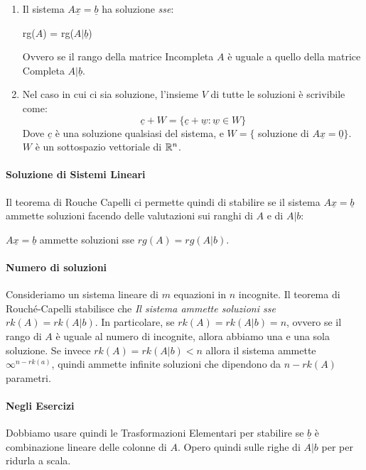 \begin{enumerate}
	\item Il sistema $A\underline{x}=\underline{b}$ ha soluzione \emph{sse}:
	      \begin{center}
		      rg($A$) = rg($A|\underline{b}$)
	      \end{center}
	      Ovvero se il rango della matrice Incompleta $A$ è uguale a quello della matrice Completa $A|\underline{b}$.
	\item Nel caso in cui ci sia soluzione, l'insieme $V$ di tutte le soluzioni è scrivibile come:
	      \[ \underline{c} + W = \{ \underline{c} + \underline{w} : \underline{w} \in W\} \]
	      Dove $\underline{c}$ è una soluzione qualsiasi del sistema, e $W= \{$ soluzione di $A\underline{x} = \underline{0} \}$.
	      $W$ è un sottospazio vettoriale di $\mathbb{R}^n$.
\end{enumerate}

\paragraph{Soluzione di Sistemi Lineari}
Il teorema di Rouche Capelli ci permette quindi di stabilire se il sistema $A\underline{x} =\underline{b}$ ammette soluzioni
facendo delle valutazioni sui ranghi di $A$ e di $A|b$:
\begin{center}
	$A\underline{x} =\underline{b}$ ammette soluzioni sse $rg(A) = rg(A|b)$.
\end{center}

\paragraph{Numero di soluzioni}
Consideriamo un sistema lineare di $m$ equazioni in $n$ incognite. 
Il teorema di Rouché-Capelli stabilisce che \emph{Il sistema ammette soluzioni sse $rk(A)=rk(A|b)$}.
In particolare, se $rk(A) = rk(A|b) = n$, ovvero se il rango di $A$ è uguale al numero di incognite, allora abbiamo una e una sola soluzione.
Se invece $rk(A)=rk(A|b)<n$ allora il sistema ammette $\infty^{n-rk(a)}$, quindi ammette infinite soluzioni che dipendono da $n-rk(A)$ parametri.


\paragraph{Negli Esercizi}
Dobbiamo usare quindi le Trasformazioni Elementari per stabilire se $\underline{b}$ è combinazione lineare delle colonne di $A$.
Opero quindi sulle righe di $A|b$ per per ridurla a scala.

